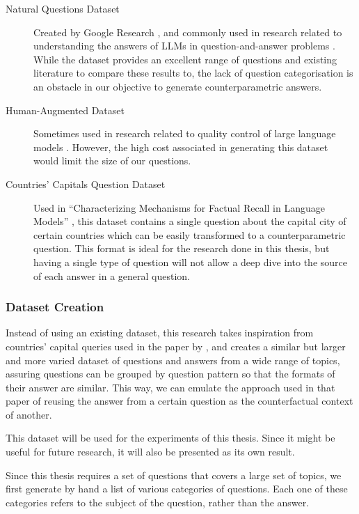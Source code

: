 \begin{description}
	\item[Natural Questions Dataset] Created by Google Research \citep{natural_questions}, and commonly used in research related to understanding the answers of LLMs in question-and-answer problems \citep{ragged,when_not_to_trust_llms,can_rag_models_reason}.
		While the dataset provides an excellent range of questions and existing literature to compare these results to, the lack of question categorisation is an obstacle in our objective to generate counterparametric answers.
	\item[Human-Augmented Dataset] Sometimes used in research related to quality control of large language models \citep{learning_the_difference}.
		However, the high cost associated in generating this dataset would limit the size of our questions.
	\item[Countries' Capitals Question Dataset] Used in ``Characterizing Mechanisms for Factual Recall in Language Models'' \citep{factual_recall}, this dataset contains a single question about the capital city of certain countries which can be easily transformed to a counterparametric question.
		This format is ideal for the research done in this thesis, but having a single type of question will not allow a deep dive into the source of each answer in a general question.
\end{description}

\subsubsection{Dataset Creation}

Instead of using an existing dataset, this research takes inspiration from countries' capital queries used in the paper by \citeauthor{factual_recall}, and creates a similar but larger and more varied dataset of questions and answers from a wide range of topics, assuring questions can be grouped by question pattern so that the formats of their answer are similar.
This way, we can emulate the approach used in that paper of reusing the answer from a certain question as the counterfactual context of another.

This dataset will be used for the experiments of this thesis.
Since it might be useful for future research, it will also be presented as its own result.

Since this thesis requires a set of questions that covers a large set of topics, we first generate by hand a list of various categories of questions.
Each one of these categories refers to the subject of the question, rather than the answer.

